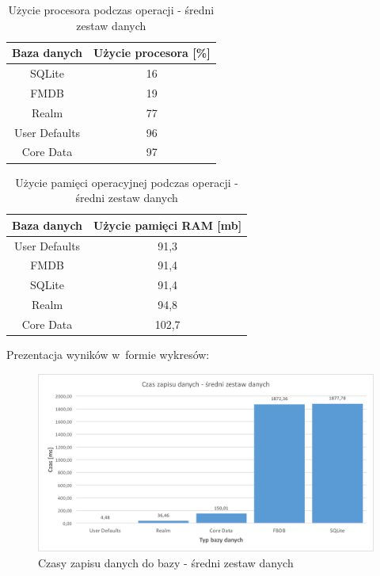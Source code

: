\newpage

\begin{table}[h]
\centering
\caption{Użycie procesora podczas operacji - średni zestaw danych}
\label{tab: medium-save-cpu-table}
\begin{tabular}{|c|c|}
\hline
Baza danych   & Użycie procesora [\%] \\ \hline
SQLite        & 16                    \\ \hline
FMDB          & 19                    \\ \hline
Realm         & 77                    \\ \hline
User Defaults & 96                    \\ \hline
Core Data     & 97                    \\ \hline
\end{tabular}
\end{table}

\begin{table}[h]
\centering
\caption{Użycie pamięci operacyjnej podczas operacji - średni zestaw danych}
\label{tab: medium-save-ram-table}
\begin{tabular}{|c|c|}
\hline
Baza danych   & Użycie pamięci RAM [mb] \\ \hline
User Defaults & 91,3                    \\ \hline
FMDB          & 91,4                    \\ \hline
SQLite        & 91,4                    \\ \hline
Realm         & 94,8                    \\ \hline
Core Data     & 102,7                   \\ \hline
\end{tabular}
\end{table}

\newpage

Prezentacja wyników w~formie wykresów: 

\begin{figure}[h]
\centering
	\includegraphics[width=15cm]{img/save_data/save_speed_medium.png}
	\caption{Czasy zapisu danych do bazy - średni zestaw danych}
	\label{fig: medium-save-time}
\end{figure}


